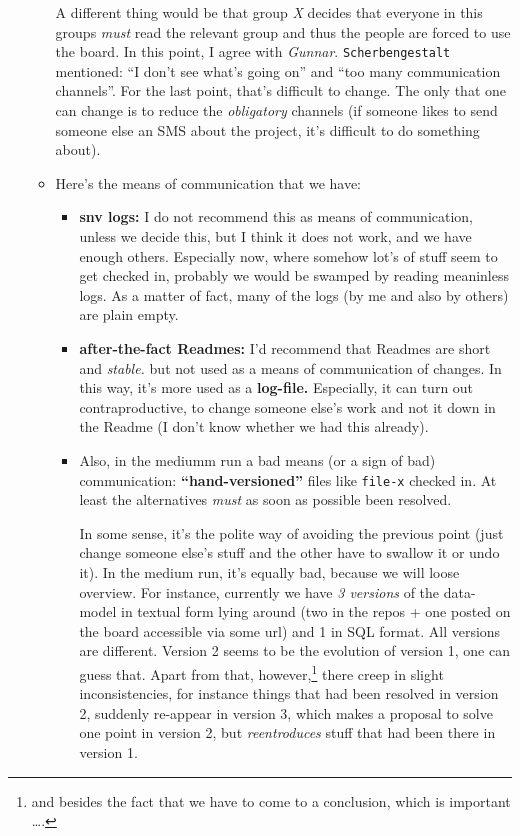 \begin{itemize}
\begin{itemize}
      A different thing would be that group \emph{X} decides that everyone
      in this groups \emph{must} read the relevant group and thus the
      people are forced to use the board. In this point, I agree with
      \emph{Gunnar}. \texttt{Scherbengestalt} mentioned: ``I don't see
      what's going on'' and ``too many communication channels''. For the
      last point, that's difficult to change. The only that one can change
      is to reduce the \emph{obligatory} channels (if someone likes to send
      someone else an SMS about the project, it's difficult to do something
      about).
    \item Here's the means of communication that we have:
      \begin{itemize}
      \item \textbf{snv logs:} I do not recommend this as means of
        communication, unless we decide this, but I think it does not work,
        and we have enough others. Especially now, where somehow lot's of
        stuff seem to get checked in, probably we would be swamped by
        reading meaninless logs. As a matter of fact, many of the logs (by
        me and also by others) are plain empty.
      \item \textbf{after-the-fact Readmes:} I'd recommend that Readmes are
        short and \emph{stable.} but not used as a means of communication
        of changes. In this way, it's more used as a \textbf{log-file.}
        Especially, it can turn out contraproductive, to change someone
        else's work and not it down in the Readme (I don't know whether we
        had this already).
      \item Also, in the mediumm run a bad means (or a sign of bad)
        communication: \textbf{``hand-versioned''} files like
        \texttt{file-x} checked in. At least the alternatives \emph{must}
        as soon as possible been resolved.
        
        In some sense, it's the polite way of avoiding the previous point
        (just change someone else's stuff and the other have to swallow it
        or undo it). In the medium run, it's equally bad, because we will
        loose overview. For instance, currently we have \emph{3 versions}
        of the data-model in textual form lying around (two in the repos +
        one posted on the board accessible via some url) and 1 in SQL
        format. All versions are different. Version 2 seems to be the
        evolution of version 1, one can guess that. Apart from that,
        however,\footnote{and besides the fact that we have to come to a
          conclusion, which is important \ldots.} there creep in slight
        inconsistencies, for instance things that had been resolved in
        version 2, suddenly re-appear in version 3, which makes a proposal
        to solve one point in version 2, but \emph{reentroduces} stuff that
        had been there in version 1. 
        

\end{itemize}
\end{itemize}
\end{itemize}

